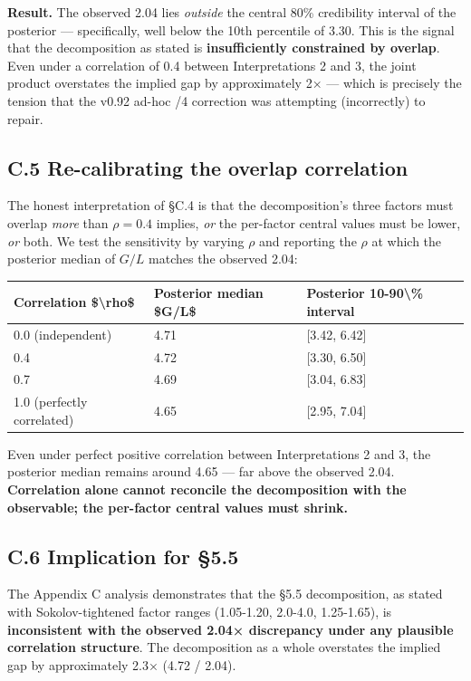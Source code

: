 \documentclass[11pt,a4paper]{article}
\begin{document}
\textbf{Result.} The observed 2.04 lies \emph{outside} the central 80\% credibility interval of the posterior --- specifically, well below the 10th percentile of 3.30. This is the signal that the decomposition as stated is \textbf{insufficiently constrained by overlap}. Even under a correlation of 0.4 between Interpretations 2 and 3, the joint product overstates the implied gap by approximately 2× --- which is precisely the tension that the v0.92 ad-hoc /4 correction was attempting (incorrectly) to repair.

\subsection{C.5 Re-calibrating the overlap correlation}

The honest interpretation of §C.4 is that the decomposition's three factors must overlap \emph{more} than $\rho = 0.4$ implies, \emph{or} the per-factor central values must be lower, \emph{or} both. We test the sensitivity by varying $\rho$ and reporting the $\rho$ at which the posterior median of $G/L$ matches the observed 2.04:

\begin{center}
\begin{tabular}{lll}
\toprule
Correlation \$\textbackslash{}rho\$ & Posterior median \$G/L\$ & Posterior 10-90\textbackslash{}\% interval \\
\midrule
0.0 (independent) & 4.71 & [3.42, 6.42] \\
0.4 & 4.72 & [3.30, 6.50] \\
0.7 & 4.69 & [3.04, 6.83] \\
1.0 (perfectly correlated) & 4.65 & [2.95, 7.04] \\
\bottomrule
\end{tabular}
\end{center}


Even under perfect positive correlation between Interpretations 2 and 3, the posterior median remains around 4.65 --- far above the observed 2.04. \textbf{Correlation alone cannot reconcile the decomposition with the observable; the per-factor central values must shrink.}

\subsection{C.6 Implication for §5.5}

The Appendix C analysis demonstrates that the §5.5 decomposition, as stated with Sokolov-tightened factor ranges (1.05-1.20, 2.0-4.0, 1.25-1.65), is \textbf{inconsistent with the observed 2.04× discrepancy under any plausible correlation structure}. The decomposition as a whole overstates the implied gap by approximately 2.3× (4.72 / 2.04).
\end{document}
